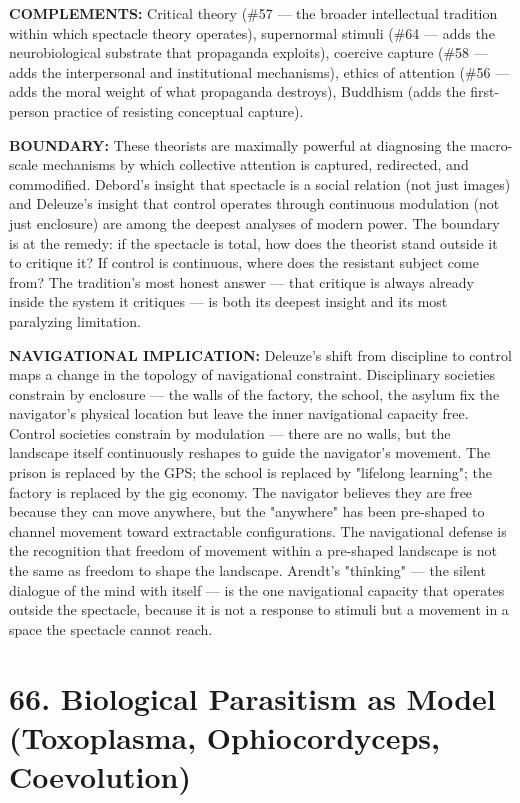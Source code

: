 \textbf{COMPLEMENTS:} Critical theory (\#57 — the broader intellectual tradition within which spectacle theory operates), supernormal stimuli (\#64 — adds the neurobiological substrate that propaganda exploits), coercive capture (\#58 — adds the interpersonal and institutional mechanisms), ethics of attention (\#56 — adds the moral weight of what propaganda destroys), Buddhism (adds the first-person practice of resisting conceptual capture).


\textbf{BOUNDARY:} These theorists are maximally powerful at diagnosing the macro-scale mechanisms by which collective attention is captured, redirected, and commodified. Debord's insight that spectacle is a social relation (not just images) and Deleuze's insight that control operates through continuous modulation (not just enclosure) are among the deepest analyses of modern power. The boundary is at the remedy: if the spectacle is total, how does the theorist stand outside it to critique it? If control is continuous, where does the resistant subject come from? The tradition's most honest answer — that critique is always already inside the system it critiques — is both its deepest insight and its most paralyzing limitation.


\textbf{NAVIGATIONAL IMPLICATION:} Deleuze's shift from discipline to control maps a change in the topology of navigational constraint. Disciplinary societies constrain by enclosure — the walls of the factory, the school, the asylum fix the navigator's physical location but leave the inner navigational capacity free. Control societies constrain by modulation — there are no walls, but the landscape itself continuously reshapes to guide the navigator's movement. The prison is replaced by the GPS; the school is replaced by "lifelong learning"; the factory is replaced by the gig economy. The navigator believes they are free because they can move anywhere, but the "anywhere" has been pre-shaped to channel movement toward extractable configurations. The navigational defense is the recognition that freedom of movement within a pre-shaped landscape is not the same as freedom to shape the landscape. Arendt's "thinking" — the silent dialogue of the mind with itself — is the one navigational capacity that operates outside the spectacle, because it is not a response to stimuli but a movement in a space the spectacle cannot reach.


\bigskip\noindent\makebox[\textwidth]{\color{rulegray}\rule{5cm}{0.3pt}}\bigskip


\section*{66. Biological Parasitism as Model (Toxoplasma, Ophiocordyceps, Coevolution)}


